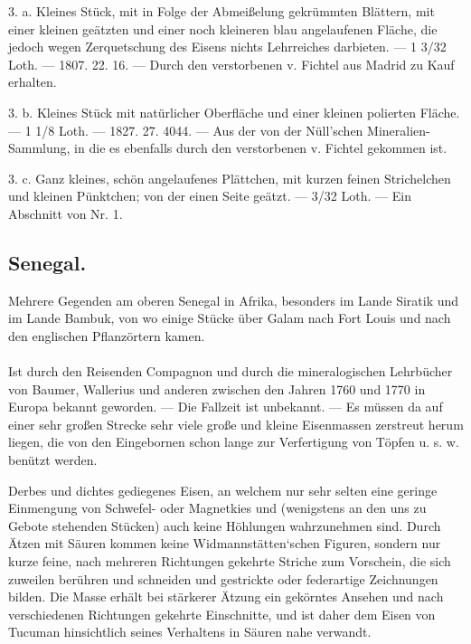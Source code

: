 \documentclass[a4paper, 11pt, oneside, polutonikogreek, german]{article}
\begin{document}
3. a. Kleines Stück, mit in Folge der Abmeißelung gekrümmten Blättern, mit einer kleinen geätzten und einer noch kleineren blau angelaufenen Fläche, die jedoch wegen Zerquetschung des Eisens nichts Lehrreiches darbieten. — 1 3/32 Loth. — 1807. 22. 16. — Durch den verstorbenen v. Fichtel aus Madrid zu Kauf erhalten.

3. b. Kleines Stück mit natürlicher Oberfläche und einer kleinen polierten Fläche. — 1 1/8 Loth. — 1827. 27. 4044. — Aus der von der Nüll'schen Mineralien-Sammlung, in die es ebenfalls durch den verstorbenen v. Fichtel gekommen ist.

3. c. Ganz kleines, schön angelaufenes Plättchen, mit kurzen feinen Strichelchen und kleinen Pünktchen; von der einen Seite geätzt. — 3/32 Loth. — Ein Abschnitt von Nr. 1.
\subsection{Senegal.}
\begin{center}
\small
Mehrere Gegenden am oberen Senegal in Afrika, besonders im Lande Siratik und im Lande Bambuk, von wo einige Stücke über Galam nach Fort Louis und nach den englischen Pflanzörtern kamen.
\end{center}
\paragraph{}
Ist durch den Reisenden Compagnon und durch die mineralogischen Lehrbücher von Baumer, Wallerius und anderen zwischen den Jahren 1760 und 1770 in Europa bekannt geworden. — Die Fallzeit ist unbekannt. — Es müssen da auf einer sehr großen Strecke sehr viele große und kleine Eisenmassen zerstreut herum liegen, die von den Eingebornen schon lange zur Verfertigung von Töpfen u. s. w. benützt werden.

Derbes und dichtes gediegenes Eisen, an welchem nur sehr selten eine geringe Einmengung von Schwefel- oder Magnetkies und (wenigstens an den uns zu Gebote stehenden Stücken) auch keine Höhlungen wahrzunehmen sind. Durch Ätzen mit Säuren kommen keine Widmannstätten‘schen Figuren, sondern nur kurze feine, nach mehreren Richtungen gekehrte Striche zum Vorschein, die sich zuweilen berühren und schneiden und gestrickte oder federartige Zeichnungen bilden. Die Masse erhält bei stärkerer Ätzung ein gekörntes Ansehen und nach verschiedenen Richtungen gekehrte Einschnitte, und ist daher dem Eisen von Tucuman hinsichtlich seines Verhaltens in Säuren nahe verwandt.
\end{document}
